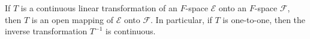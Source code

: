 If $T$ is a continuous linear transformation of an $F$-space $\mathcal{E}$ onto an $F$-space $\mathcal{F}$, then $T$ is an open mapping of $\mathcal{E}$ onto $\mathcal{F}$. In particular, if $T$ is one-to-one, then the inverse transformation $T^{-1}$ is continuous.
